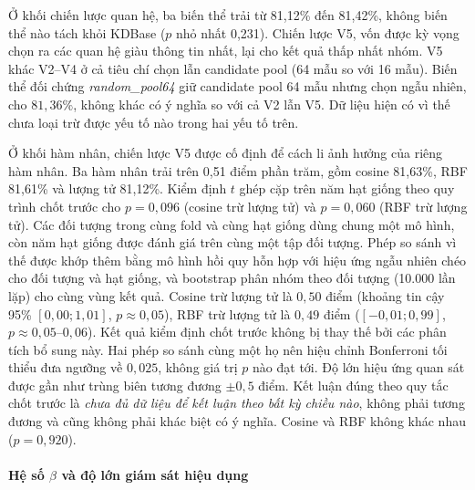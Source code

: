 Ở khối chiến lược quan hệ, ba biến thể trải từ 81,12\% đến 81,42\%, không
biến thể nào tách khỏi KDBase ($p$ nhỏ nhất 0,231). Chiến lược V5, vốn được
kỳ vọng chọn ra các quan hệ giàu thông tin nhất, lại cho kết quả thấp nhất
nhóm. V5 khác V2--V4 ở cả tiêu chí chọn lẫn candidate pool (64 mẫu so với
16 mẫu). Biến thể đối chứng \emph{random\_pool64} giữ candidate pool 64 mẫu
nhưng chọn ngẫu nhiên, cho $81{,}36\%$, không khác có ý nghĩa so với cả V2
lẫn V5. Dữ liệu hiện có vì thế chưa loại trừ được yếu tố nào trong hai yếu
tố trên.

Ở khối hàm nhân, chiến lược V5 được cố định để cách li ảnh hưởng của riêng
hàm nhân. Ba hàm nhân trải trên 0,51 điểm phần trăm, gồm cosine 81,63\%,
RBF 81,61\% và lượng tử 81,12\%. Kiểm định $t$ ghép cặp trên năm hạt giống
theo quy trình chốt trước cho $p = 0{,}096$ (cosine trừ lượng tử) và
$p = 0{,}060$ (RBF trừ lượng tử). Các đối tượng trong cùng fold và cùng hạt giống dùng chung một mô hình, còn
năm hạt giống được đánh giá trên cùng một tập đối tượng. Phép so sánh vì thế được khớp thêm
bằng mô hình hồi quy hỗn hợp với hiệu ứng ngẫu nhiên chéo cho đối tượng và
hạt giống, và bootstrap phân nhóm theo đối tượng (10.000 lần lặp) cho cùng
vùng kết quả. Cosine trừ lượng tử là
$0{,}50$ điểm (khoảng tin cậy 95\% $[0{,}00; 1{,}01]$, $p \approx 0{,}05$),
RBF trừ lượng tử là $0{,}49$ điểm ($[-0{,}01; 0{,}99]$,
$p \approx 0{,}05$--$0{,}06$). Kết quả kiểm định chốt trước không bị thay
thế bởi các phân tích bổ sung này. Hai phép so sánh cùng một họ nên hiệu
chỉnh Bonferroni tối thiểu đưa ngưỡng về $0{,}025$, không giá trị $p$ nào
đạt tới. Độ lớn hiệu ứng quan sát được gần như trùng biên tương đương
$\pm 0{,}5$ điểm. Kết luận đúng theo quy tắc chốt trước là \emph{chưa đủ dữ
liệu để kết luận theo bất kỳ chiều nào}, không phải tương đương và cũng
không phải khác biệt có ý nghĩa. Cosine và RBF không khác nhau
($p = 0{,}920$).

\paragraph{Hệ số $\beta$ và độ lớn giám sát hiệu dụng}

